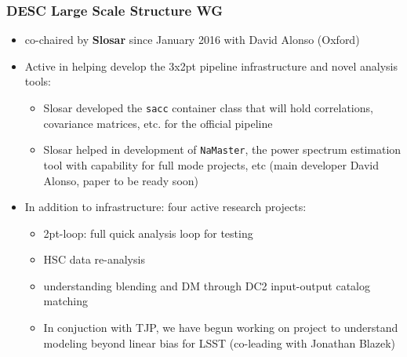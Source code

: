 \documentclass[aspectratio=169]{beamer}
\begin{document}
\begin{frame}
\frametitle {DESC Large Scale Structure WG}

\begin{itemize}  
\item co-chaired by \textbf{Slosar} since January 2016 with David
  Alonso (Oxford)

\item Active in helping develop the 3x2pt pipeline infrastructure and
  novel analysis tools:
  \begin{itemize}
  \item Slosar developed the \texttt{sacc} container class that will
    hold correlations, covariance matrices, etc. for the official
    pipeline

  \item Slosar helped in development of \texttt{NaMaster}, the power
    spectrum estimation tool with capability for full mode projects,
    etc (main developer David Alonso, paper to be ready soon)
  \end{itemize}

\item In addition to infrastructure: four active research projects:

  \begin{itemize}
  \item 2pt-loop: full quick analysis loop for testing
  \item HSC data re-analysis
  \item understanding blending and DM through DC2 input-output catalog
    matching

  \item In conjuction with TJP, we have begun working on project to
  understand modeling beyond linear bias for LSST (co-leading with
  Jonathan Blazek)

  \end{itemize}






\end{itemize}
\end{frame}
\end{document}

